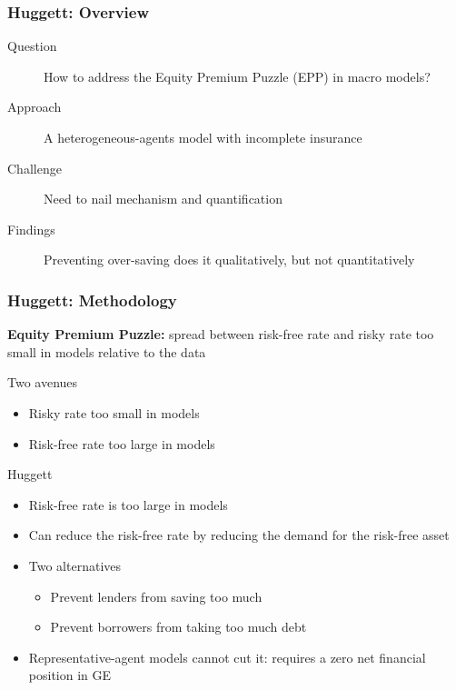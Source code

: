 \documentclass[10pt, aspectratio=1610, natbib, handout]{beamer}
\begin{document}
  \begin{frame}
    \frametitle{Huggett: Overview}

    \begin{description}
      \item[Question] How to address the Equity Premium Puzzle (EPP) in macro models?
      \vfill\pause
      \item[Approach] A heterogeneous-agents model with incomplete insurance
      \vfill\pause
      \item[Challenge] Need to nail mechanism and quantification
      \vfill\pause
      \item[Findings] Preventing over-saving does it qualitatively, but not quantitatively
    \end{description}

  \end{frame}

  \begin{frame}
    \frametitle{Huggett: Methodology}

    \textbf{Equity Premium Puzzle:} spread between risk-free rate and risky rate too small in models relative to the data

    \vfill\pause

    Two avenues
    \begin{itemize}
      \item Risky rate too small in models
      \item Risk-free rate too large in models
    \end{itemize}

    \vfill\pause

    Huggett
    \begin{itemize}
      \item Risk-free rate is too large in models \hfill {}
      \item Can reduce the risk-free rate by reducing the demand for the risk-free asset
      \item Two alternatives
        \begin{itemize}
          \item Prevent lenders from saving too much \hfill {}
          \item Prevent borrowers from taking too much debt \hfill {}
        \end{itemize}
      \item Representative-agent models cannot cut it: requires a zero net financial position in GE
    \end{itemize}

  \end{frame}
\end{document}
